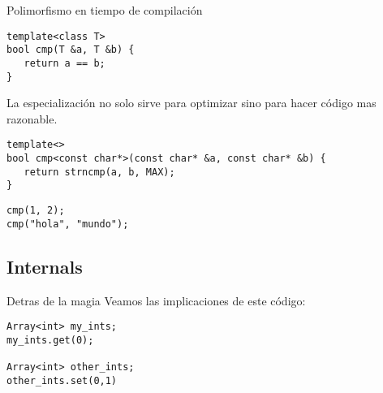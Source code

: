 \begin{frame}[fragile]{Polimorfismo en tiempo de compilaci\'on}{}
   \begin{lstlisting}[style=normal,linebackgroundcolor={%
         \only<1,3>{\def\lst@linebgrdcmd####1####2####3{}}%
         \btLstHLB<2>{3}% a==b para strings
   }]
template<class T>
bool cmp(T &a, T &b) {
   return a == b;
}
   \end{lstlisting}
   \pause
La especializaci\'on no solo sirve para optimizar sino para hacer c\'odigo mas razonable.
   \begin{lstlisting}[style=normal,firstnumber=5,linebackgroundcolor={%
         \only<1,3>{\def\lst@linebgrdcmd####1####2####3{}}%
         \btLstHLB<2>{7}% a==b para strings
   }]
template<>
bool cmp<const char*>(const char* &a, const char* &b) {
   return strncmp(a, b, MAX);
}
   \end{lstlisting}
   \pause
   \begin{lstlisting}[style=normal,firstnumber=9]
cmp(1, 2);
cmp("hola", "mundo");
   \end{lstlisting}
\end{frame}


\subsection{Internals}
\begin{frame}[fragile]{Detras de la magia}
Veamos las implicaciones de este c\'odigo:
   \begin{lstlisting}[style=normal]
Array<int> my_ints;
my_ints.get(0);

Array<int> other_ints;
other_ints.set(0,1)
   \end{lstlisting}
\end{frame}



